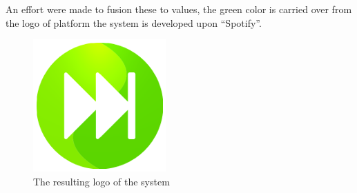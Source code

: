 An effort were made to fusion these to values, the green color is carried over from the logo of platform the system is developed upon \enquote{Spotify}.

\begin{figure}
  \centering
  \includegraphics[width=0.5\linewidth]{Images/Icon.png}
  \caption{The resulting logo of the system}
  \label{fig:logo}
\end{figure}
